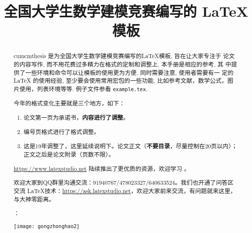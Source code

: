 \documentclass[withoutpreface,bwprint]{cumcmthesis} %
\title{全国大学生数学建模竞赛编写的 \LaTeX{} 模板}
\begin{document}
\maketitle
\begin{abstract}
    cumcmthesis 是为全国大学生数学建模竞赛编写的\LaTeX{}模板, 旨在让大家专注于 论文的内容写作, 而不用花费过多精力在格式的定制和调整上. 本手册是相应的参考, 其 中提供了一些环境和命令可以让模板的使用更为方便. 同时需要注意, 使用者需要有一 定的 \LaTeX{} 的使用经验, 至少要会使用常用宏包的一些功能, 比如参考文献，数学公式，图片使用，列表环境等等. 例子文件参看 \texttt{example.tex}.

    \begin{mdframed} [%
            roundcorner=5pt,
            linecolor=gray!50,
            outerlinewidth=0.5pt,
            middlelinewidth=0.3pt, backgroundcolor=gray!2,
            innertopmargin=\topskip, frametitle={2020 年建模比赛格式变化说明},
            frametitlefont= \bfseries,frametitlerule=true,frametitlealignment =\raggedright\noindent,
            frametitlerulewidth=.5pt, frametitlebackgroundcolor=gray!2,]
        今年的格式变化主要就是三个地方，如下：
        \begin{enumerate}
            \item 论文第一页为承诺书，\textbf{\color{red}内容进行了调整}。

            \item 编号页格式进行了格式调整。

            \item 这是19年调整了，这里延续说明下。论文正文（\textbf{\color{red}不要目录}，尽量控制在20页以内）；正文之后是论文附录（页数不限）。

        \end{enumerate}

    \end{mdframed}

    \url{https://www.latexstudio.net} 陆续推出了更优质的资源，欢迎学习 。

    欢迎大家到QQ群里沟通交流：91940767/478023327/640633524。我们也开通了问答区交流 \LaTeX{}技术：\url{https://ask.latexstudio.net}，欢迎大家前来交流，有问题就来这里，与大神零距离。

    ：

    \centerline{\texttt{[image: gongzhonghao2]}}

\end{abstract}
\end{document}
